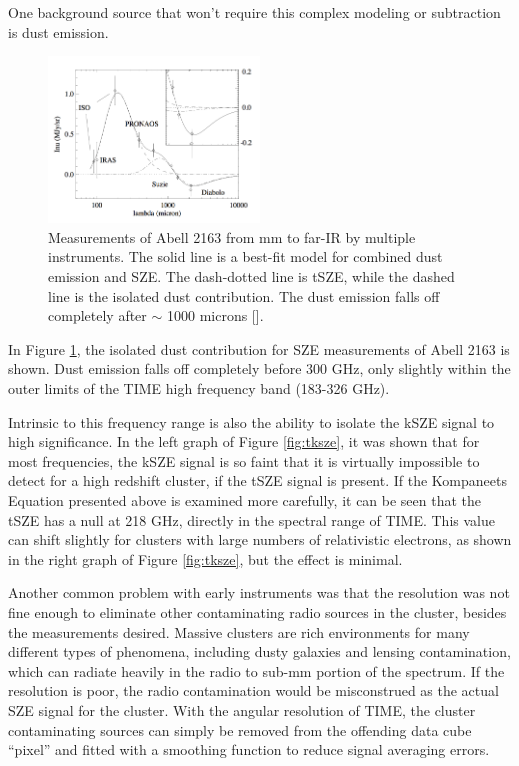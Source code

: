 \documentclass[manuscript]{aastex}
\begin{document}
One background source that won't require this complex modeling or subtraction is dust emission.
\begin{figure}
\vspace{-0.8cm}
  \begin{center}
    \includegraphics[width=0.5\textwidth]{birkinshaw1.png}
   \end{center}
\caption[TIME's frequency window will be mostly free of dust emission contamination. -(\cite{Birkinshaw1999})]{Measurements of Abell 2163 from mm to far-IR by multiple instruments. The solid line is a best-fit model for combined dust emission and SZE. The dash-dotted line is tSZE, while the dashed line is the isolated dust contribution. The dust emission falls off completely after $\sim$ 1000 microns [\cite{Birkinshaw1999}].}
\label{fig:dust}
\end{figure}
In Figure \ref{fig:dust}, the isolated dust contribution for SZE measurements of Abell 2163 is shown. Dust emission falls off completely before 300 GHz, only slightly within the outer limits of the TIME high frequency band (183-326 GHz). 

Intrinsic to this frequency range is also the ability to isolate the kSZE signal to high significance. In the left graph of Figure \ref{fig:tksze}, it was shown that for most frequencies, the kSZE signal is so faint that it is virtually impossible to detect for a high redshift cluster, if the tSZE signal is present. If the Kompaneets Equation presented above is examined more carefully, it can be seen that the tSZE has a null at 218 GHz, directly in the spectral range of TIME. This value can shift slightly for clusters with large numbers of relativistic electrons, as shown in the right graph of Figure \ref{fig:tksze}, but the effect is minimal. 

Another common problem with early instruments was that the resolution was not fine enough to eliminate other contaminating radio sources in the cluster, besides the measurements desired. Massive clusters are rich environments for many different types of phenomena, including dusty galaxies and lensing contamination, which can radiate heavily in the radio to sub-mm portion of the spectrum. If the resolution is poor, the radio contamination would be misconstrued as the actual SZE signal for the cluster. With the angular resolution of TIME, the cluster contaminating sources can simply be removed from the offending data cube ``pixel'' and fitted with a smoothing function to reduce signal averaging errors. 
\end{document}
